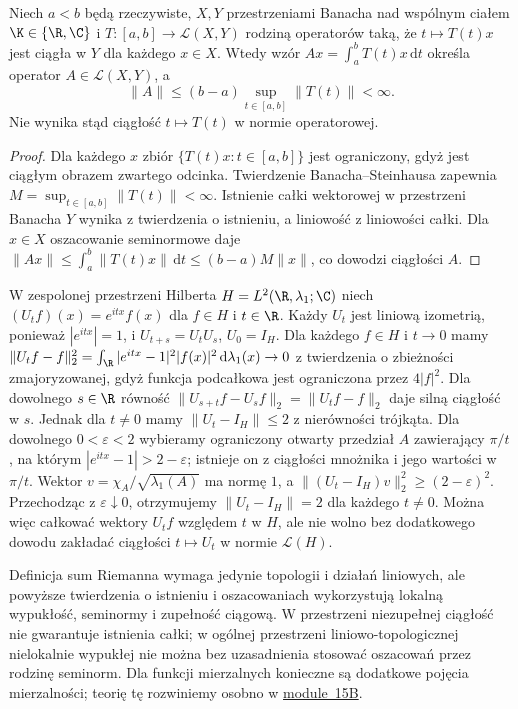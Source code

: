 \begin{twierdzenie}
\label{thm:strong-operator-integral15a}
Niech $a<b$ będą rzeczywiste, $X,Y$ przestrzeniami Banacha
nad wspólnym ciałem $\K\in\{\R,\C\}$ i
$T:[a,b]\to\mathcal L(X,Y)$ rodziną operatorów taką, że
$t\mapsto T(t)x$ jest ciągła w $Y$ dla każdego $x\in X$.
Wtedy wzór
$Ax=\int_a^b T(t)x\,\mathrm dt$ określa operator
$A\in\mathcal L(X,Y)$, a
\[
 \|A\|\le(b-a)\sup_{t\in[a,b]}\|T(t)\|<\infty.
\]
Nie wynika stąd ciągłość $t\mapsto T(t)$ w normie operatorowej.
\end{twierdzenie}
\begin{proof}
Dla każdego $x$ zbiór $\{T(t)x:t\in[a,b]\}$ jest ograniczony,
gdyż jest ciągłym obrazem zwartego odcinka. Twierdzenie
Banacha--Steinhausa zapewnia
$M=\sup_{t\in[a,b]}\|T(t)\|<\infty$.
Istnienie całki wektorowej w przestrzeni Banacha $Y$
wynika z twierdzenia o istnieniu, a liniowość z
liniowości całki. Dla $x\in X$ oszacowanie seminormowe
daje $\|Ax\|\le\int_a^b\|T(t)x\|\,\mathrm dt
\le(b-a)M\|x\|$, co dowodzi ciągłości $A$.
\end{proof}

\begin{przyklad}
\label{ex:strong-not-norm-cont15a}
W zespolonej przestrzeni Hilberta $H=L^2(\R,\lambda_1;\C)$ niech
$(U_t f)(x)=e^{itx}f(x)$ dla $f\in H$ i $t\in\R$.
Każdy $U_t$ jest liniową izometrią, ponieważ $|e^{itx}|=1$,
i $U_{t+s}=U_tU_s$, $U_0=I_H$. Dla każdego $f\in H$
i $t\to0$ mamy
$\|U_tf-f\|_2^2=\int_\R |e^{itx}-1|^2|f(x)|^2\,\mathrm d\lambda_1(x)
\to0$ z twierdzenia o zbieżności zmajoryzowanej, gdyż
funkcja podcałkowa jest ograniczona przez $4|f|^2$.
Dla dowolnego $s\in\R$ równość
$\|U_{s+t}f-U_sf\|_2=\|U_tf-f\|_2$ daje silną ciągłość w $s$.
Jednak dla $t\ne0$ mamy $\|U_t-I_H\|\le2$ z nierówności
trójkąta. Dla dowolnego $0<\varepsilon<2$ wybieramy
ograniczony otwarty przedział $A$ zawierający $\pi/t$,
na którym $|e^{itx}-1|>2-\varepsilon$; istnieje on z
ciągłości mnożnika i jego wartości w $\pi/t$.
Wektor $v=\chi_A/\sqrt{\lambda_1(A)}$ ma normę $1$, a
$\|(U_t-I_H)v\|_2^2\ge(2-\varepsilon)^2$.
Przechodząc z $\varepsilon\downarrow0$, otrzymujemy
$\|U_t-I_H\|=2$ dla każdego $t\ne0$.
Można więc całkować wektory $U_tf$ względem $t$ w $H$,
ale nie wolno bez dodatkowego dowodu zakładać ciągłości
$t\mapsto U_t$ w normie $\mathcal L(H)$.
\end{przyklad}

\begin{uwaga}
Definicja sum Riemanna wymaga jedynie topologii i działań liniowych,
ale powyższe twierdzenia o istnieniu i oszacowaniach wykorzystują
lokalną wypukłość, seminormy i zupełność ciągową. W przestrzeni
niezupełnej ciągłość nie gwarantuje istnienia całki; w ogólnej
przestrzeni liniowo-topologicznej nielokalnie wypukłej nie można
bez uzasadnienia stosować oszacowań przez rodzinę seminorm.
Dla funkcji mierzalnych konieczne są dodatkowe pojęcia mierzalności;
teorię tę rozwiniemy osobno w \hyperref[sec:integral-vector15b]{module~15B}.
\end{uwaga}

\addtocounter{section}{-1}
\endgroup
